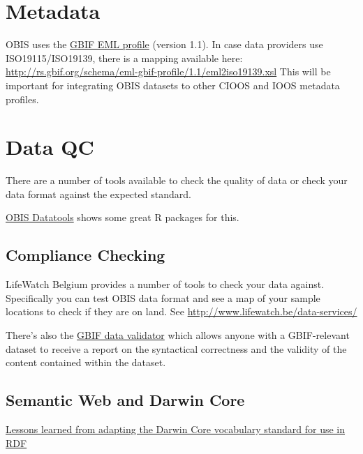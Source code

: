 \documentclass[
]{book}
\begin{document}
\hypertarget{metadata}{%
\section{Metadata}\label{metadata}}

OBIS uses the \href{http://rs.gbif.org/schema/eml-gbif-profile/1.1/eml-gbif-profile.xsd}{GBIF EML profile} (version 1.1). In case data providers use ISO19115/ISO19139, there is a mapping available here: \url{http://rs.gbif.org/schema/eml-gbif-profile/1.1/eml2iso19139.xsl} This will be important for integrating OBIS datasets to other CIOOS and IOOS metadata profiles.

\hypertarget{data-qc}{%
\section{Data QC}\label{data-qc}}

There are a number of tools available to check the quality of data or check your data format against the expected standard.

\href{https://obis.org/manual/processing/}{OBIS Datatools} shows some great R packages for this.

\hypertarget{compliance-checking}{%
\subsection{Compliance Checking}\label{compliance-checking}}

LifeWatch Belgium provides a number of tools to check your data against.
Specifically you can test OBIS data format and see a map of your sample locations to check if they are on land.
See \url{http://www.lifewatch.be/data-services/}

There's also the \href{https://www.gbif.org/tools/data-validator}{GBIF data validator} which allows anyone with a GBIF-relevant dataset to receive a report on the syntactical correctness and the validity of the content contained within the dataset.

\hypertarget{semantic-web-and-darwin-core}{%
\subsection{Semantic Web and Darwin Core}\label{semantic-web-and-darwin-core}}

\href{http://www.semantic-web-journal.net/system/files/swj1093.pdf}{Lessons learned from adapting the Darwin Core vocabulary standard for use in RDF}
\end{document}
